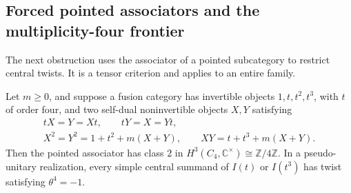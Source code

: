 \subsection{Forced pointed associators and the multiplicity-four frontier}
\label{sec:c4-forced-associator}

The next obstruction uses the associator of a pointed subcategory to restrict
central twists. It is a tensor criterion and applies to an entire family.

\begin{proposition}\label{prop:c4-forced-associator}
Let $m\geq0$, and suppose a fusion category has invertible objects
$1,t,t^2,t^3$, with $t$ of order four, and two self-dual noninvertible
objects $X,Y$ satisfying
\[
 \begin{gathered}
 tX=Y=Xt,\qquad tY=X=Yt,\\
 X^2=Y^2=1+t^2+m(X+Y),\qquad XY=t+t^3+m(X+Y).
 \end{gathered}
\]
Then the pointed associator has class $2$ in
$H^3(C_4,\mathbb C^\times)\cong\mathbb Z/4\mathbb Z$.
In a pseudo-unitary realization, every simple central summand of
$I(t)$ or $I(t^3)$ has twist satisfying $\theta^4=-1$.
\end{proposition}
